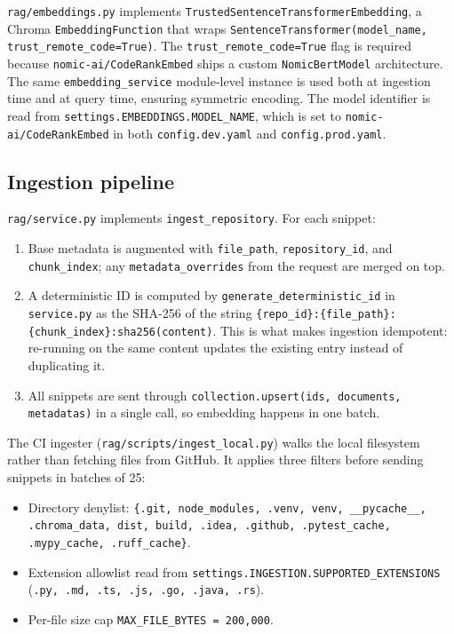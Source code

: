 \documentclass[11pt,a4paper]{article}
\newcommand{\code}[1]{\texttt{\small #1}}
\begin{document}
\code{rag/embeddings.py} implements
\code{TrustedSentenceTransformerEmbedding}, a Chroma \code{EmbeddingFunction}
that wraps \code{SentenceTransformer(model\_name, trust\_remote\_code=True)}.
The \code{trust\_remote\_code=True} flag is required because
\code{nomic-ai/CodeRankEmbed} ships a custom \code{NomicBertModel}
architecture. The same \code{embedding\_service} module-level instance is
used both at ingestion time and at query time, ensuring symmetric encoding.
The model identifier is read from \code{settings.EMBEDDINGS.MODEL\_NAME},
which is set to \code{nomic-ai/CodeRankEmbed} in both \code{config.dev.yaml}
and \code{config.prod.yaml}.

\subsection{Ingestion pipeline}

\code{rag/service.py} implements \code{ingest\_repository}. For each
snippet:

\begin{enumerate}[leftmargin=*]
  \item Base metadata is augmented with \code{file\_path},
        \code{repository\_id}, and \code{chunk\_index}; any
        \code{metadata\_overrides} from the request are merged on top.
  \item A deterministic ID is computed by
        \code{generate\_deterministic\_id} in \code{service.py} as the SHA-256
        of the string
        \code{\{repo\_id\}:\{file\_path\}:\{chunk\_index\}:sha256(content)}.
        This is what makes ingestion idempotent: re-running on the same
        content updates the existing entry instead of duplicating it.
  \item All snippets are sent through \code{collection.upsert(ids, documents,
        metadatas)} in a single call, so embedding happens in one batch.
\end{enumerate}

The CI ingester (\code{rag/scripts/ingest\_local.py}) walks the local
filesystem rather than fetching files from GitHub. It applies three filters
before sending snippets in batches of 25:

\begin{itemize}[leftmargin=*]
  \item Directory denylist:
        \code{\{.git, node\_modules, .venv, venv, \_\_pycache\_\_, .chroma\_data,
        dist, build, .idea, .github, .pytest\_cache, .mypy\_cache,
        .ruff\_cache\}}.
  \item Extension allowlist read from
        \code{settings.INGESTION.SUPPORTED\_EXTENSIONS}
        (\code{.py, .md, .ts, .js, .go, .java, .rs}).
  \item Per-file size cap \code{MAX\_FILE\_BYTES = 200{,}000}.
\end{itemize}
\end{document}
